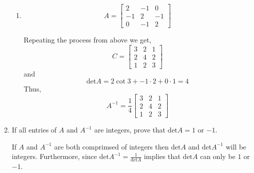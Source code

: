\begin{enumerate}
\begin{enumerate}[label=\alph*.]
            \item 
                \begin{equation}
                    A =
                    \begin{bmatrix}
                        2 & -1 & 0 \\
                        -1 & 2 & -1 \\
                        0 & -1 & 2
                    \end{bmatrix}
                \end{equation}
                \begin{mdframed}[style=MyFrame]
                    Repeating the process from above we get,
                    \begin{equation}
                        C = 
                        \begin{bmatrix}
                            3       &       2       &       1   \\
                            2       &       4       &       2   \\
                            1       &       2       &       3   
                        \end{bmatrix}
                    \end{equation}
                    and 
                    \begin{equation}
                        \text{det}A = 2 \cot 3 + -1\cdot2 + 0 \cdot 1 
                                        = 4
                    \end{equation}
                    Thus,
                    \begin{equation}
                        A^{-1} = 
                        \frac{1}{4}
                        \begin{bmatrix}
                            3       &       2       &       1   \\
                            2       &       4       &       2   \\
                            1       &       2       &       3   
                        \end{bmatrix}
                    \end{equation}
                \end{mdframed}


        \end{enumerate}
        
    \item If all entries of $A$ and $A^{-1}$ are integers, prove that
        $\text{det}A=1$ or $-1$.
        \begin{mdframed}[style=MyFrame]
            If $A$ and $A^{-1}$ are both comprimsed of integers then
            $\text{det}A$ and $\text{det}A^{-1}$  will be integers.
            Furthermore, since $\text{det}A^{-1} = \frac{1}{\text{det}A}$
            implies that $\text{det}A$ can only be $1$ or $-1$.
        \end{mdframed}


\end{enumerate}
